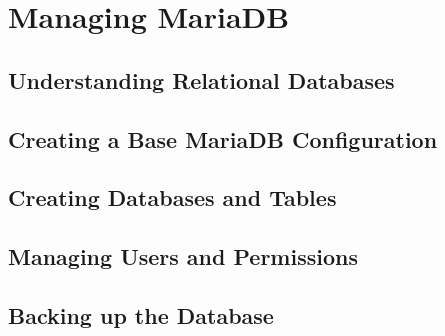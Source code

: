 \chapter{Managing MariaDB}

\section{Understanding Relational Databases}
\section{Creating a Base MariaDB Configuration}
\section{Creating Databases and Tables}
\section{Managing Users and Permissions}
\section{Backing up the Database}
